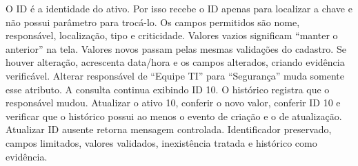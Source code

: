
 O ID é a identidade do ativo. Por isso  recebe o ID apenas para localizar a chave e não possui parâmetro para trocá-lo. Os campos permitidos são nome, responsável, localização, tipo e criticidade.
 Valores vazios significam ``manter o anterior'' na tela. Valores novos passam pelas mesmas validações do cadastro. Se houver alteração,  acrescenta data/hora e os campos alterados, criando evidência verificável.
 Alterar responsável de ``Equipe TI'' para ``Segurança'' muda somente esse atributo. A consulta continua exibindo ID 10. O histórico registra que o responsável mudou.
 Atualizar o ativo 10, conferir o novo valor, conferir ID 10 e verificar que o histórico possui ao menos o evento de criação e o de atualização. Atualizar ID ausente retorna mensagem controlada.
 Identificador preservado, campos limitados, valores validados, inexistência tratada e histórico como evidência.


